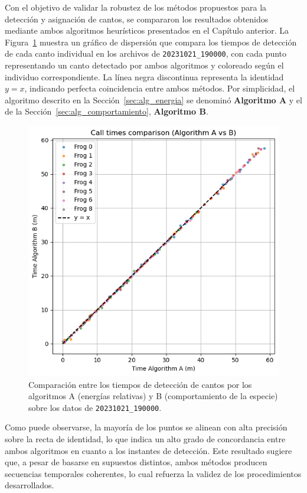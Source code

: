 Con el objetivo de validar la robustez de los métodos propuestos 
para la detección y asignación de cantos, se compararon los 
resultados obtenidos mediante ambos algoritmos heurísticos 
presentados en el Capítulo anterior. 
La Figura~\ref{fig:alg_comparison} muestra un gráfico de 
dispersión que compara los tiempos de detección de cada canto 
individual en los archivos de \texttt{20231021\_190000}, con cada 
punto representando un canto detectado por ambos algoritmos y 
coloreado según el individuo correspondiente. La línea negra 
discontinua representa la identidad \( y = x \), indicando 
perfecta coincidencia entre ambos métodos. Por simplicidad,
el algoritmo descrito en la Sección~\ref{sec:alg_energia} se
denominó \textbf{Algoritmo A} y el de la Sección~\ref{sec:alg_comportamiento},
\textbf{Algoritmo B}.

\begin{figure}[ht]
    \centering
    \includegraphics[width=\columnwidth]{Graphics/times_comparison.png}
    \caption{Comparación entre los tiempos de detección de cantos por los algoritmos A (energías relativas) y B (comportamiento de la especie) sobre los datos de \texttt{20231021\_190000}.}
    \label{fig:alg_comparison}
\end{figure}

Como puede observarse, la mayoría de los puntos se alinean con 
alta precisión sobre la recta de identidad, lo que indica un 
alto grado de concordancia entre ambos algoritmos en cuanto a 
los instantes de detección. Este resultado sugiere que, a pesar 
de basarse en supuestos distintos, ambos métodos producen 
secuencias temporales coherentes, lo cual refuerza la validez 
de los procedimientos desarrollados.

